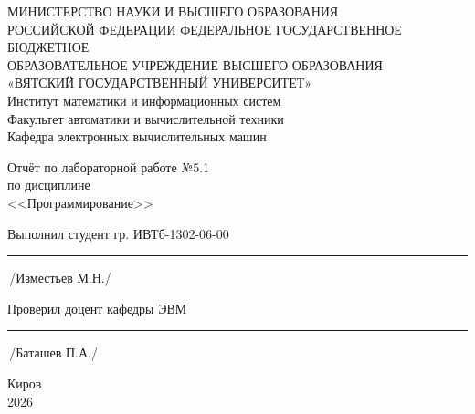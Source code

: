 \documentclass[oneside,a4paper,14pt]{extarticle}
\begin{document}
    \newpage\thispagestyle{empty}
    \begin{center}
        МИНИСТЕРСТВО НАУКИ И ВЫСШЕГО ОБРАЗОВАНИЯ\\
            РОССИЙСКОЙ ФЕДЕРАЦИИ
            ФЕДЕРАЛЬНОЕ ГОСУДАРСТВЕННОЕ БЮДЖЕТНОЕ\\
            ОБРАЗОВАТЕЛЬНОЕ
            УЧРЕЖДЕНИЕ ВЫСШЕГО ОБРАЗОВАНИЯ\\
            «ВЯТСКИЙ ГОСУДАРСТВЕННЫЙ УНИВЕРСИТЕТ»\\
            Институт математики и информационных систем\\
            Факультет автоматики и вычислительной техники\\
            Кафедра электронных вычислительных машин
    \end{center}
    \vspace{20mm}

    \begin{center}
        Отчёт по лабораторной работе №5.1\\
        по дисциплине\\
        <<Программирование>>\\
    \end{center}
    \vspace{48mm}

    Выполнил студент гр. ИВТб-1302-06-00 \hspace{10mm} \rule[-0,5mm]{30mm}{0.15mm}\,/Изместьев М.Н./


    Проверил доцент кафедры ЭВМ \hfill  \rule[-0,5mm]{30mm}{0.15mm}\,/Баташев П.А./

    \vfill
    \begin{center}
        Киров\\
        2026
    \end{center}

    \newpage\thispagestyle{empty}
\end{document}
